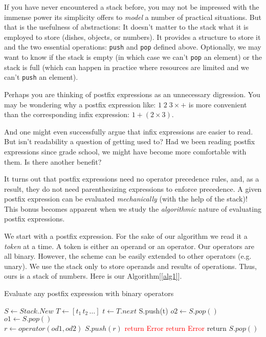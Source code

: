 \documentclass[english,smartquotes]{hgbarticle}
\begin{document}
If you have never encountered a stack before, you may not be impressed with the immense power its simplicity offers to \emph{model} a number of practical situations. But that is the usefulness of abstractions: It doesn't matter to the stack what it is employed to store (dishes, objects, or numbers). It provides a structure to store it and the two essential operations: \texttt{push} and \texttt{pop} defined above. Optionally, we may want to know if the stack is empty (in which case we can't \texttt{pop} an element) or the stack is full (which can happen in practice where resources are limited and we can't \texttt{push} an element).

Perhaps you are thinking of postfix expressions as an unnecessary digression. You may be wondering why a postfix expression like: $1\;2\;3\times +$ is more convenient than the corresponding infix expression: $1+(2\times 3)$.

And one might even successfully argue that infix expressions are easier to read. But isn't readability a question of getting used to? Had we been reading postfix expressions since grade school, we might have become more comfortable with them. Is there another benefit? 

It turns out that postfix expressions need no operator precedence rules, and, as a result, they do not need parenthesizing expressions to enforce precedence. A given postfix expression can be evaluated \emph{mechanically} (with the help of the stack)! This bonus becomes apparent when we study the \emph{algorithmic} nature of evaluating postfix expressions. 

We start with a postfix expression. For the sake of our algorithm we read it a \textit{token} at a time. A token is either an operand or an operator. Our operators are all binary. However, the scheme can be easily extended to other operators (e.g. unary). We use the stack only to store operands and results of operations. Thus, ours is a stack of numbers. Here is our Algorithm[\ref{alg1}].
\begin{algorithm}
\caption{Evaluate any postfix expression with binary operators}
\label{alg1}
\begin{algorithmic}[1]
  \State $S \gets Stack.New$
  \State $T \gets [t_1\, t_2\, \dots]$
	 
	  \State $t \gets T.next$
			\State S.push(t)
		 
			\State $o2 \gets S.pop()$ 
			\State $o1 \gets S.pop()$ 
			\\
			\State $r \gets operator(od1, od2)$ 
			\State $S.push(r)$
		\Else 
		  \State \textcolor{red}{return Error} 
		\EndIf
	\EndWhile
	  \State \textcolor{red}{return Error} 
	\Else 
	  \State return $S.pop()$
	\EndIf
\end{algorithmic}
\end{algorithm}
\end{document}
